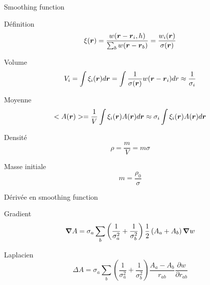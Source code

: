 \begin{frame}[<+->]{Smoothing function}
 \begin{block}{Définition}
 \begin{equation*}
  \xi({\boldsymbol {r}})=\frac{w({\boldsymbol {r}}-{\boldsymbol {r}}_{i},h)}{\sum_{b} w({\boldsymbol {r}}-{\boldsymbol {r}}_b)}=\frac{w_{i}({\boldsymbol {r}})}{\sigma({\boldsymbol {r}})}
  \end{equation*}
 \end{block}
\begin{block}{Volume}
 \begin{equation*}
  V_{i}=\int \xi_{i}({\boldsymbol {r}}) d{\boldsymbol {r}}=\int \frac{1}{\sigma({\boldsymbol {r}})}w({\boldsymbol {r}}-{\boldsymbol {r}}_i)dr\approx \frac{1}{\sigma_i}
 \end{equation*}

\end{block}
\begin{block}{Moyenne}
 \begin{equation*}
  <A({\boldsymbol {r}})>=\frac{1}{V}\int \xi_{i}({\boldsymbol {r}})A({\boldsymbol {r}})d{\boldsymbol {r}}\approx \sigma_{i}\int \xi_{i}({\boldsymbol {r}})A({\boldsymbol {r}})d{\boldsymbol {r}}
 \end{equation*}

\end{block}

\begin{block}{Densité}
 \begin{equation*}
  \rho=\frac{m}{V}=m\sigma
 \end{equation*}
\end{block}

\begin{block}{Masse initiale}
\begin{equation*}
 m=\frac{\rho_0}{\sigma}
\end{equation*}
\end{block}
\end{frame}

\begin{frame}[<+->]{Dérivée en smoothing function}
\begin{block}{Gradient}
 \begin{equation*}
  {\boldsymbol {\nabla}} A=\sigma_{a}\sum_{b}\left(\frac{1}{\sigma_{a}^2}+\frac{1}{\sigma_{b}^2}\right)\frac{1}{2}\left(A_a+A_b\right){\boldsymbol {\nabla}} w
 \end{equation*}

\end{block}

\begin{block}{Laplacien}
\begin{equation*}
 \Delta A=\sigma_{a}\sum_{b}\left(\frac{1}{\sigma_{a}^2}+\frac{1}{\sigma_{b}^2}\right)\frac{A_a-A_b}{r_{ab}}\frac{\partial w}{\partial r_{ab}}
\end{equation*}

\end{block}
\end{frame}
